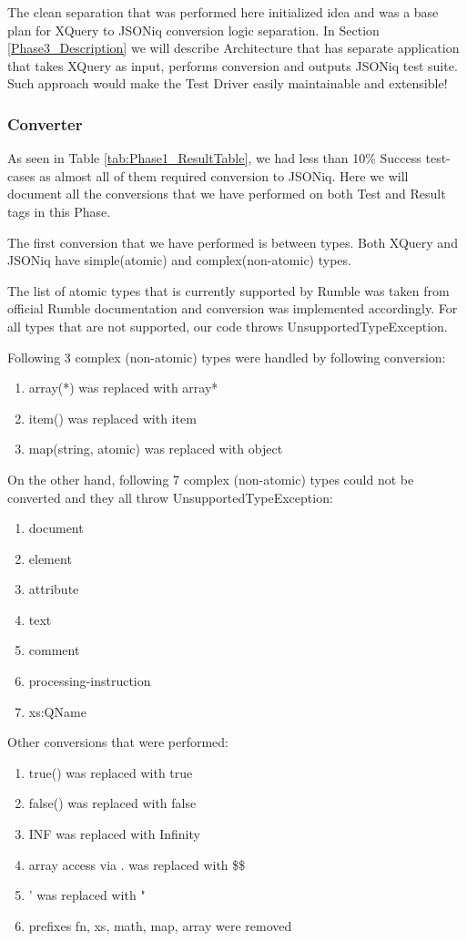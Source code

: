 The clean separation that was performed here initialized idea and was a base plan for XQuery to JSONiq conversion logic separation. In Section \ref{Phase3_Description} we will describe Architecture that has separate application that takes XQuery as input, performs conversion and outputs JSONiq test suite. Such approach would make the Test Driver easily maintainable and extensible!

\subsubsection{Converter}
\label{Phase2_Converter}
As seen in Table \ref{tab:Phase1_ResultTable}, we had less than 10\% Success test-cases as almost all of them required conversion to JSONiq. Here we will document all the conversions that we have performed on both Test and Result tags in this Phase. 

The first conversion that we have performed is between types. Both XQuery and JSONiq have simple(atomic) and complex(non-atomic) types. 

The list of atomic types that is currently supported by Rumble was taken from official Rumble documentation \cite{RumbleSupportedTypes} and conversion was implemented accordingly. For all types that are not supported, our code throws UnsupportedTypeException. 

Following 3 complex (non-atomic) types were handled by following conversion:
\begin{enumerate}
	\item array(*) was replaced with array*
	\item item() was replaced with item
	\item map(string, atomic) was replaced with object 
\end{enumerate}

On the other hand, following 7 complex (non-atomic) types could not be converted and they all throw UnsupportedTypeException:
\begin{enumerate}
	\item document
	\item element
	\item attribute
	\item text
	\item comment
	\item processing-instruction
	\item xs:QName
\end{enumerate}

Other conversions that were performed:
\begin{enumerate}
	\item true() was replaced with true
	\item false() was replaced with false
	\item INF was replaced with Infinity
	\item array access via . was replaced with \$\$
	\item ' was replaced with "
	\item prefixes fn, xs, math, map, array were removed
\end{enumerate}

